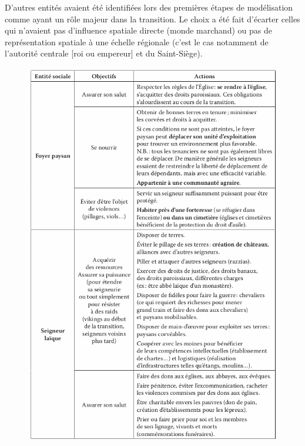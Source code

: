 \documentclass[12pt, a4paper, oneside]{book}
\begin{document}
	
	D'autres entités avaient été identifiées lors des premières étapes de modélisation comme ayant un rôle majeur dans la transition.
	Le choix a été fait d'écarter celles qui n'avaient pas d'influence spatiale directe (monde marchand) ou pas de représentation spatiale à une échelle régionale (c'est le cas notamment de l'autorité centrale [roi ou empereur] et du Saint-Siège).
	
	\begin{figure}[H]
		\centering
		\includegraphics[width=1\linewidth]{src/Chapitre_TMD/Tab1_1.png}
	\end{figure}
\end{document}
